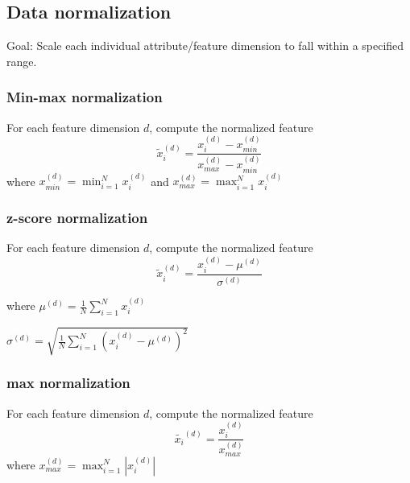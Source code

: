 \subsection{Data normalization}
Goal: Scale each individual attribute/feature dimension to fall
within a specified range. 

\subsubsection{Min-max normalization}
For each feature dimension $d$, compute the normalized feature
\[
  \tilde{x}_i^{(d)} = \frac{x_i^{(d)} - x_{min}^{(d)}}{x_{max}^{(d)} - x_{min}^{(d)}}
\]
where $x_{min}^{(d)} = \min_{i=1}^N x_i^{(d)}$ and $x_{max}^{(d)} = \max_{i=1}^N x_i^{(d)}$

\subsubsection{z-score normalization}
For each feature dimension $d$, compute the normalized feature
\[
  \tilde{x}_i^{(d)} = \frac{x_i^{(d)} - \mu^{(d)}}{\sigma^{(d)}}
\]

where $\mu^{(d)} = \frac{1}{N} \sum_{i=1}^{N} x_i^{(d)}$

$\sigma^{(d)} = \sqrt{\frac{1}{N}\sum_{i=1}^{N} (x_i^{(d)} - \mu^{(d)})^2}$

\subsubsection{max normalization}
For each feature dimension $d$, compute the normalized feature \[
  \tilde{x_i}^{(d)} = \frac{x_i^{(d)}}{x_{max}^{(d)}}
\]
where $x_{max}^{(d)} = \max_{i=1}^N \left|x_i^{(d)}\right|$

